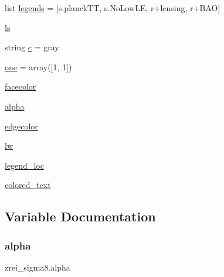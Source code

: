 \begin{DoxyCompactItemize}
\item 
list \mbox{\hyperlink{namespacezrei__sigma8_a3fd075bcf80d3eb3f171b8a7981b6c1c}{legends}} = \mbox{[}s.\+planck\+TT, s.\+No\+Low\+LE, r\textquotesingle{}+lensing\textquotesingle{}, r\textquotesingle{}+B\+AO\textquotesingle{}\mbox{]}
\item 
\mbox{\hyperlink{namespacezrei__sigma8_a869524d26b2f97451fc49bc1f43e8009}{ls}}
\item 
string \mbox{\hyperlink{namespacezrei__sigma8_aed0a682d3dfa6ca3a654c5209ba62862}{c}} = \textquotesingle{}gray\textquotesingle{}
\item 
\mbox{\hyperlink{namespacezrei__sigma8_aab4a2cb46912496a1ce312010fcf174c}{one}} = array(\mbox{[}1, 1\mbox{]})
\item 
\mbox{\hyperlink{namespacezrei__sigma8_a0796aee48ea8b92b735de5dcc0cd0eef}{facecolor}}
\item 
\mbox{\hyperlink{namespacezrei__sigma8_a64b51509cdab9a320483879fd29f2645}{alpha}}
\item 
\mbox{\hyperlink{namespacezrei__sigma8_aca19323bc04c28a636e2c58121edffc0}{edgecolor}}
\item 
\mbox{\hyperlink{namespacezrei__sigma8_a3fc886f3effc060fc779433464928e6a}{lw}}
\item 
\mbox{\hyperlink{namespacezrei__sigma8_a45cb080b4cc9534f4714e2f39b2010b2}{legend\+\_\+loc}}
\item 
\mbox{\hyperlink{namespacezrei__sigma8_a85504a8d920d44d5e09d83f4ba80e395}{colored\+\_\+text}}
\end{DoxyCompactItemize}


\subsection{Variable Documentation}
\mbox{\label{namespacezrei__sigma8_a64b51509cdab9a320483879fd29f2645}} 
\subsubsection{\texorpdfstring{alpha}{alpha}}
{\footnotesize\ttfamily zrei\+\_\+sigma8.\+alpha}

\mbox{\label{namespacezrei__sigma8_aed0a682d3dfa6ca3a654c5209ba62862}} 
